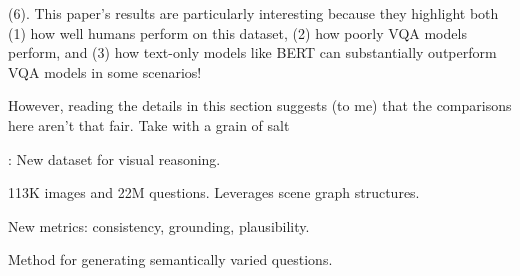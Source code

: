 \documentclass[11pt]{article}
\begin{document}
 (6). This paper's results are particularly interesting because they highlight both (1) how well humans perform on this dataset, (2) how poorly VQA models perform, and (3) how text-only models like BERT can substantially outperform VQA models in some scenarios!


However, reading the details in this section suggests (to me) that the comparisons here aren't that fair. Take with a grain of salt\textellipsis









: New dataset for visual reasoning. 
\begin{compactitem}
	\item 113K images and 22M questions. Leverages  scene graph structures. 
	\item New metrics: consistency, grounding, plausibility.
	\item Method for generating semantically varied questions.
\end{compactitem}
\end{document}
